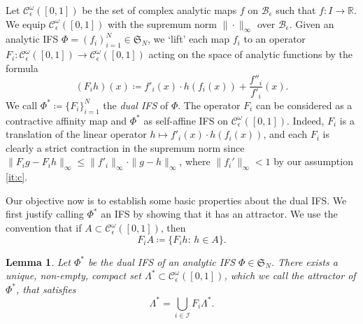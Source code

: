 \documentclass[11pt,]{article}
\def\cref#1{\ref{#1}}%
\newtheorem{lemma}[theorem]{Lemma}
\theoremstyle{definition}
\theoremstyle{remark}
\newcommand{\0}{\mathbf{0}}
\begin{document}
Let $\mathcal{C}_\epsilon^\omega([0,1])$ be the set of complex analytic maps $f$ on
$\mathcal{B}_{\epsilon}$ such that $f\colon I \to \mathbb{R}$. We equip
$\mathcal{C}_\epsilon^\omega([0,1])$ with the supremum norm $\|\cdot\|_\infty$ over
$\mathcal{B}_\epsilon$. Given an analytic IFS $\Phi=(f_i)_{i=1}^N\in\mathfrak{S}_N$, we `lift' each
map $f_i$ to an operator $F_i:
\mathcal{C}^{\omega}_\epsilon([0,1]) \to \mathcal{C}_\epsilon^{\omega}([0,1])$ acting on the space of analytic
functions by the formula
\begin{equation}\label{eq:LiftedIFS}
	(F_i h)(x)\coloneqq f'_i(x)\cdot h(f_i(x)) + \frac{f''_i}{f'_i}(x).
\end{equation}
We call $\Phi^*\coloneqq\{F_i\}_{i=1}^N$ the \emph{dual IFS} of $\Phi$. The operator $F_i$ can be
considered as a contractive affinity map and $\Phi^*$ as self-affine IFS on
$\mathcal{C}_\epsilon^\omega([0,1])$.  Indeed, $F_i$ is a translation of the linear operator
$h\mapsto f'_i(x)\cdot h(f_i(x))$, and each $F_i$ is clearly a strict contraction in the supremum
norm since $\|F_ig-F_ih\|_{\infty}\leq \|f'_i\|_{\infty}\cdot\|g-h\|_{\infty}$, where
$\|f_i'\|_\infty<1$ by our assumption \cref{it:c}.

Our objective now is to establish some basic properties about the dual IFS. We first justify calling
$\Phi^*$ an IFS by showing that it has an
attractor. We use the convention that if $A\subset \mathcal{C}^{\omega}_\epsilon([0,1])$, then
\begin{equation*}
	F_iA \coloneqq \{F_i h:\, h\in A\}.
\end{equation*}
\begin{lemma}\label{lem:ExistanceAttractor}
	Let $\Phi^*$ be the dual IFS of an analytic IFS $\Phi\in\mathfrak{S}_N$. There exists a
	unique, non-empty, compact set $\Lambda^*\subset \mathcal{C}^{\omega}_\epsilon([0,1])$,
	which we call the \emph{attractor} of $\Phi^*$, that satisfies
	\begin{equation*}
		\Lambda^*=\bigcup_{i\in\mathcal{I}} F_i\Lambda^*.
	\end{equation*} 
\end{lemma} 
\end{document}
